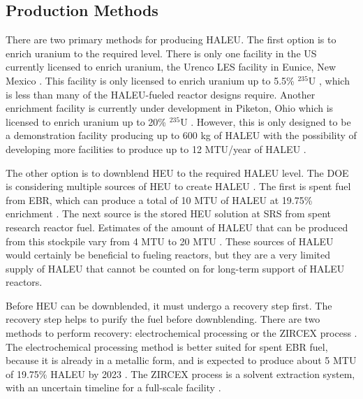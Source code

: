 \subsection{Production Methods}
There are two primary methods for producing \gls{HALEU}. The first 
option is to enrich uranium to the required level. There is only one 
facility in the US currently 
licensed to enrich uranium, the Urenco LES facility in Eunice, 
New Mexico \cite{nuclear_energy_institute_establishing_2022}. This facility is only 
licensed to enrich uranium up to 5.5\% $^{235}$U 
\cite{nuclear_energy_institute_establishing_2022},
which is less than many of the \gls{HALEU}-fueled reactor designs 
require. Another enrichment facility is currently under development in 
Piketon, Ohio which is licensed to enrich uranium up to 20\% 
$^{235}$U \cite{nuclear_energy_institute_establishing_2022}. However, this is only 
designed to be a demonstration facility producing up to 600 kg of 
\gls{HALEU} \cite{us_nuclear_regulatory_commission_centrus_2021} 
with the possibility of 
developing more facilities to produce up to 12 MTU/year of \gls{HALEU}
\cite{nuclear_energy_institute_establishing_2022}.

The other option is to downblend \gls{HEU} to the required \gls{HALEU}
level. The \gls{DOE} is considering multiple sources of \gls{HEU} 
to create \gls{HALEU} \cite{nuclear_energy_institute_establishing_2022}. The 
first is spent fuel from \gls{EBR}, which can produce a total of 10 MTU 
of \gls{HALEU} at 19.75\% enrichment \cite{nuclear_energy_institute_establishing_2022}. 
The next source is the stored \gls{HEU} solution at \gls{SRS} from 
spent research reactor fuel. Estimates of the amount of \gls{HALEU}
that can be produced from this stockpile vary from 4 MTU 
\cite{nuclear_energy_institute_establishing_2022} to 20 MTU \cite{regalbuto_addressing_2020}.
These sources of 
\gls{HALEU} would certainly be beneficial to fueling reactors, but they 
are a very limited supply of \gls{HALEU} that cannot be counted on 
for long-term support of \gls{HALEU} reactors.

Before \gls{HEU} can be downblended, it must undergo a recovery step first. 
The recovery step helps to purify the fuel before downblending. There 
are two methods to perform recovery: electrochemical processing or 
the ZIRCEX process \cite{herczeg_high-assay_2019}. The electrochemical 
processing method is better suited for spent \gls{EBR} fuel, because it is 
already in a metallic form, and is expected to produce about 5 MTU of 
19.75\% \gls{HALEU} by 2023 \cite{herczeg_high-assay_2019}. The ZIRCEX 
process is a solvent extraction system, with an uncertain timeline 
for a full-scale facility \cite{herczeg_high-assay_2019}. 

